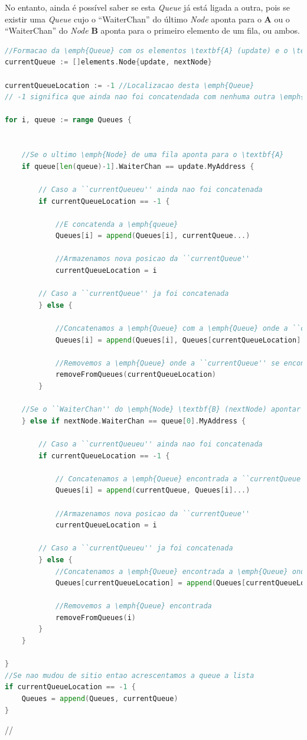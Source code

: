 No entanto, ainda é possível saber se esta \emph{Queue} já está ligada a outra, pois se existir uma \emph{Queue} cujo o ``WaiterChan'' do último \emph{Node} aponta para o \textbf{A} ou o ``WaiterChan'' do \emph{Node} \textbf{B} aponta para o primeiro elemento de um fila, ou ambos.



\begin{lstlisting}[caption={Alterações nas filas caso o \emph{Node} seja do tipo ``Waiter With Request'' nem o \textbf{A} nem o \textbf{B} estão em filas. },language=Go]
//Formacao da \emph{Queue} com os elementos \textbf{A} (update) e o \textbf{B} (nextNode)
currentQueue := []elements.Node{update, nextNode}

currentQueueLocation := -1 //Localizacao desta \emph{Queue}
// -1 significa que ainda nao foi concatendada com nenhuma outra \emph{Queue}

for i, queue := range Queues {


	//Se o ultimo \emph{Node} de uma fila aponta para o \textbf{A}
	if queue[len(queue)-1].WaiterChan == update.MyAddress {

		// Caso a ``currentQueueu'' ainda nao foi concatenada
		if currentQueueLocation == -1 {

			//E concatenda a \emph{queue} 
			Queues[i] = append(Queues[i], currentQueue...)

			//Armazenamos nova posicao da ``currentQueue''
			currentQueueLocation = i

		// Caso a ``currentQueue'' ja foi concatenada
		} else {

			//Concatenamos a \emph{Queue} com a \emph{Queue} onde a ``currentQueue'' se encontra
			Queues[i] = append(Queues[i], Queues[currentQueueLocation]...)

			//Removemos a \emph{Queue} onde a ``currentQueue'' se encontra
			removeFromQueues(currentQueueLocation)
		}

	//Se o ``WaiterChan'' do \emph{Node} \textbf{B} (nextNode) apontar para o primeiro de uma \emph{Queue}
	} else if nextNode.WaiterChan == queue[0].MyAddress {

		// Caso a ``currentQueueu'' ainda nao foi concatenada
		if currentQueueLocation == -1 {

			// Concatenamos a \emph{Queue} encontrada a ``currentQueue'', que passa a estar na mesma posicao (substitui)
			Queues[i] = append(currentQueue, Queues[i]...)

			//Armazenamos nova posicao da ``currentQueue''
			currentQueueLocation = i

		// Caso a ``currentQueueu'' ja foi concatenada
		} else {
			//Concatenamos a \emph{Queue} encontrada a \emph{Queue} onde a ``currentQueue'' se encontra
			Queues[currentQueueLocation] = append(Queues[currentQueueLocation], Queues[i]...)

			//Removemos a \emph{Queue} encontrada
			removeFromQueues(i)
		}
	}

}
//Se nao mudou de sitio entao acrescentamos a queue a lista 
if currentQueueLocation == -1 {
	Queues = append(Queues, currentQueue)
}


\end{lstlisting}//




